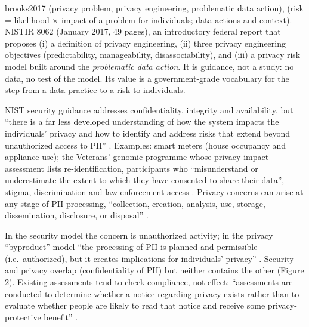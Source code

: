 \begin{papercard}{brooks2017}
  (privacy problem, privacy engineering, problematic data action),  (risk = likelihood $\times$ impact of a problem for individuals; data actions and context). NISTIR 8062 (January 2017, 49 pages), an introductory federal report that proposes (i) a definition of privacy engineering, (ii) three privacy engineering objectives (predictability, manageability, disassociability), and (iii) a privacy risk model built around the \emph{problematic data action}. It is guidance, not a study: no data, no test of the model. Its value is a government-grade vocabulary for the step from a data practice to a risk to individuals.

 NIST security guidance addresses confidentiality, integrity and availability, but ``there is a far less developed understanding of how the system impacts the individuals' privacy and how to identify and address risks that extend beyond unauthorized access to PII'' . Examples: smart meters (house occupancy and appliance use); the Veterans' genomic programme whose privacy impact assessment lists re-identification, participants who ``misunderstand or underestimate the extent to which they have consented to share their data'', stigma, discrimination and law-enforcement access . Privacy concerns can arise at any stage of PII processing, ``collection, creation, analysis, use, storage, dissemination, disclosure, or disposal'' .

 In the security model the concern is unauthorized activity; in the privacy ``byproduct'' model ``the processing of PII is planned and permissible (i.e.\ authorized), but it creates implications for individuals' privacy'' . Security and privacy overlap (confidentiality of PII) but neither contains the other (Figure 2). Existing assessments tend to check compliance, not effect: ``assessments are conducted to determine whether a notice regarding privacy exists rather than to evaluate whether people are likely to read that notice and receive some privacy-protective benefit'' .


\end{papercard}
